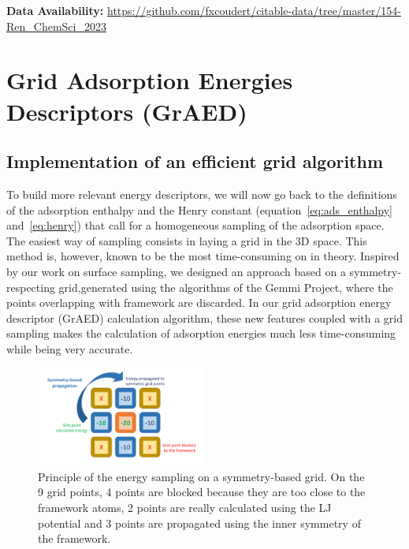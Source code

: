 \documentclass[main]{subfiles}
\begin{document}
\textbf{Data Availability:} \url{https://github.com/fxcoudert/citable-data/tree/master/154-Ren_ChemSci_2023}

\section{Grid Adsorption Energies Descriptors (GrAED)}\label{sct:grid}

\subsection{Implementation of an efficient grid algorithm}

To build more relevant energy descriptors, we will now go back to the definitions of the adsorption enthalpy and the Henry constant (equation~\ref{eq:ads_enthalpy} and~\ref{eq:henry}) that call for a homogeneous sampling of the adsorption space. The easiest way of sampling consists in laying a grid in the 3D space. This method is, however, known to be the most time-consuming on in theory. Inspired by our work on surface sampling, we designed an approach based on a symmetry-respecting grid,generated using the algorithms of the Gemmi Project,\autocite{Wojdyr_2022} where the points overlapping with framework are discarded. In our grid adsorption energy descriptor (GrAED) calculation algorithm, these new features coupled with a grid sampling makes the calculation of adsorption energies much less time-consuming while being very accurate.

\begin{figure}[ht]
  \centering
    \includegraphics[width=0.5\textwidth]{figures/3-fastsim/grid_sampling.pdf}
    \caption{Principle of the energy sampling on a symmetry-based grid. On the 9 grid points, 4 points are blocked because they are too close to the framework atoms, 2 points are really calculated using the LJ potential and 3 points are propagated using the inner symmetry of the framework.}\label{fgr:principle_grid}
\end{figure}
\end{document}
